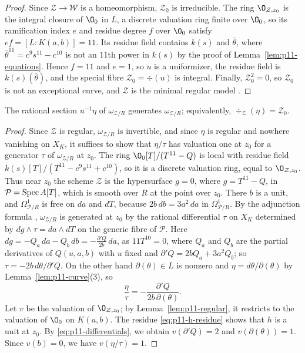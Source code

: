 \begin{proof}
Since $\mathcal Z\to\mathcal W$ is a homeomorphism, $\mathcal Z_0$ is irreducible.
The ring $\O_{\mathcal Z,z_0}$ is the integral closure of $\O_0$ in $L$, a discrete valuation ring finite over $\O_0$, so its ramification index $e$ and residue degree $f$ over $\O_0$ satisfy $ef = [L:K(a,b)] = 11$.
Its residue field contains $k(s)$ and $\bar\theta$, where $\bar\theta^{11} = c^9s^{11}-c^{10}$ is not an $11$th power in $k(s)$ by the proof of Lemma~\ref{lem:p11-equations}.
Hence $f = 11$ and $e = 1$, so $u$ is a uniformizer, the residue field is $k(s)(\bar\theta)$, and the special fibre $\mathcal Z_0 = \div(u)$ is integral.
Finally, $\mathcal Z_0^2 = 0$, so $\mathcal Z_0$ is not an exceptional curve, and $\mathcal Z$ is the minimal regular model \cite[Section~9.3]{Liu02}.
\end{proof}

\begin{lemma}\label{lem:p11-omega-zero}
The rational section $u^{-1}\eta$ of $\omega_{\mathcal Z/R}$ generates $\omega_{\mathcal Z/R}$; equivalently, $\div_{\mathcal Z}(\eta) = \mathcal Z_0$.
\end{lemma}

\begin{proof}
Since $\mathcal Z$ is regular, $\omega_{\mathcal Z/R}$ is invertible, and since $\eta$ is regular and nowhere vanishing on $X_K$, it suffices to show that $\eta/\tau$ has valuation one at $z_0$ for a generator $\tau$ of $\omega_{\mathcal Z/R}$ at $z_0$.
The ring $\O_0[T]/(T^{11}-Q)$ is local with residue field $k(s)[T]/(T^{11}-c^9s^{11}+c^{10})$, so it is a discrete valuation ring, equal to $\O_{\mathcal Z,z_0}$.
Thus near $z_0$ the scheme $\mathcal Z$ is the hypersurface $g = 0$, where $g = T^{11}-Q$, in $\mathcal P = \operatorname{Spec} A[T]$, which is smooth over $R$ at the point over $z_0$.
There $b$ is a unit, and $\Omega^1_{\mathcal P/R}$ is free on $da$ and $dT$, because $2b\,db = 3a^2\,da$ in $\Omega^1_{\mathcal P/R}$.
By the adjunction formula \cite[Section~6.4]{Liu02}, $\omega_{\mathcal Z/R}$ is generated at $z_0$ by the rational differential $\tau$ on $X_K$ determined by $dg\wedge\tau = da\wedge dT$ on the generic fibre of $\mathcal P$.
Here $dg = -Q_a\,da-Q_b\,db = -\frac{\partial'Q}{2b}\,da$, as $11T^{10} = 0$, where $Q_a$ and $Q_b$ are the partial derivatives of $Q(u,a,b)$ with $u$ fixed and $\partial'Q = 2bQ_a+3a^2Q_b$; so $\tau = -2b\,d\theta/\partial'Q$.
On the other hand $\partial(\theta)\in L$ is nonzero and $\eta = d\theta/\partial(\theta)$ by Lemma~\ref{lem:p11-curve}(3), so
\[
  \frac{\eta}{\tau} = -\frac{\partial'Q}{2b\,\partial(\theta)}.
\]
Let $v$ be the valuation of $\O_{\mathcal Z,z_0}$; by Lemma~\ref{lem:p11-regular}, it restricts to the valuation of $\O_0$ on $K(a,b)$.
The residue \eqref{eq:p11-h-residue} shows that $h$ is a unit at $z_0$.
By \eqref{eq:p11-differentials}, we obtain $v(\partial'Q) = 2$ and $v(\partial(\theta)) = 1$.
Since $v(b) = 0$, we have $v(\eta/\tau) = 1$.
\end{proof}

